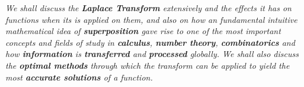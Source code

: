 \textit{We shall discuss the \textbf{Laplace Transform} extensively and the effects it has on functions when its is applied on them, and also on how an fundamental intuitive mathematical idea of \textbf{superposition} gave rise to one of the most important concepts and fields of study in \textbf{calculus}, \textbf{number theory}, \textbf{combinatorics} and how \textbf{information} is \textbf{transferred} and \textbf{processed} globally. We shall also discuss the \textbf{optimal methods} through which the transform can be applied to yield the most \textbf{accurate solutions} of a function.}
